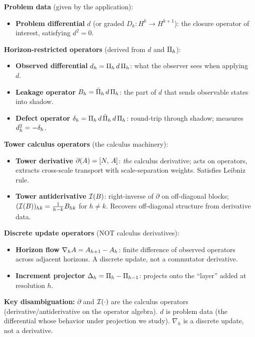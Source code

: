 \begin{tcolorbox}[colback=white, colframe=black!70, title={Taxonomy of Operators}]
\label{box:taxonomy}
\textbf{Problem data} (given by the application):
\begin{itemize}[itemsep=0.2em, leftmargin=1.5em]
\item \textbf{Problem differential} $d$ (or graded $D_k: H^k \to H^{k+1}$): the closure operator of interest, satisfying $d^2 = 0$.
\end{itemize}

\smallskip
\textbf{Horizon-restricted operators} (derived from $d$ and $\CCPi{h}$):
\begin{itemize}[itemsep=0.2em, leftmargin=1.5em]
\item \textbf{Observed differential} $\CCObs{d}{h} = \CCRestr{d}{h}$: what the observer sees when applying $d$.
\item \textbf{Leakage operator} $\CCLeak{d}{h} = \CCLeakExpr{d}{h}$: the part of $d$ that sends observable states into shadow.
\item \textbf{Defect operator} $\CCDefect{d}{h} = \CCDefectExpr{d}{h}$: round-trip through shadow; measures $\CCObs{d}{h}^2 = -\CCDefect{d}{h}$.
\end{itemize}

\smallskip
\textbf{Tower calculus operators} (the calculus machinery):
\begin{itemize}[itemsep=0.2em, leftmargin=1.5em]
\item \textbf{Tower derivative} $\CCDer{A} = \CCComm{\CCIndexOp}{A}$: \emph{the} calculus derivative; acts on operators, extracts cross-scale transport with scale-separation weights. Satisfies Leibniz rule.
\item \textbf{Tower antiderivative} $\CCInt{B}$: right-inverse of $\partial$ on off-diagonal blocks; $\CCBlock{(\CCInt{B})}{h}{k} = \frac{1}{h-k} \CCBlock{B}{h}{k}$ for $h \ne k$. Recovers off-diagonal structure from derivative data.
\end{itemize}

\smallskip
\textbf{Discrete update operators} (NOT calculus derivatives):
\begin{itemize}[itemsep=0.2em, leftmargin=1.5em]
\item \textbf{Horizon flow} $\CCFlow{A}{h} = A_{h+1} - A_h$: finite difference of observed operators across adjacent horizons. A discrete update, not a commutator derivative.
\item \textbf{Increment projector} $\CCDelta{h} = \CCPi{h} - \CCPi{h-1}$: projects onto the ``layer'' added at resolution $h$.
\end{itemize}

\smallskip
\textbf{Key disambiguation:}
$\partial$ and $\CCInt{\cdot}$ are the calculus operators (derivative/antiderivative on the operator algebra).
$d$ is problem data (the differential whose behavior under projection we study).
$\nabla_h$ is a discrete update, not a derivative.
\end{tcolorbox}

